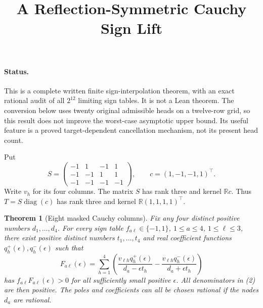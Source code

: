 \documentclass[11pt]{article}
\title{A Reflection-Symmetric Cauchy Sign Lift}
\author{}
\date{}
\newtheorem{theorem}{Theorem}
\begin{document}
\maketitle

\paragraph{Status.}
This is a complete written finite sign-interpolation theorem, with an
exact rational audit of all $2^{12}$ limiting sign tables. It is not a
Lean theorem. The conversion below uses twenty original admissible
heads on a twelve-row grid, so this result does not improve the
worst-case asymptotic upper bound. Its useful feature is a proved
target-dependent cancellation mechanism, not its present head count.

Put
\[
 S=\begin{pmatrix}-1&1&-1&1\\-1&-1&1&1\\-1&-1&-1&-1\end{pmatrix},
 \qquad c=(1,-1,-1,1)^\top.
 \tag{1}
\]
Write $v_h$ for its four columns. The matrix $S$ has rank three and
kernel $\mathbb Rc$. Thus $T=S\operatorname{diag}(c)$ has rank three
and kernel $\mathbb R(1,1,1,1)^\top$.

\begin{theorem}[Eight masked Cauchy columns]
Fix any four distinct positive numbers $d_1,\ldots,d_4$. For every
sign table $f_{a\ell}\in\{-1,1\}$, $1\le a\le4$, $1\le\ell\le3$,
there exist positive distinct numbers $t_1,\ldots,t_4$ and real
coefficient functions $q_h^+(\epsilon),q_h^-(\epsilon)$ such that
\[
 F_{a\ell}(\epsilon)=\sum_{h=1}^4
 \left(\frac{v_{\ell h}q_h^+(\epsilon)}{d_a-\epsilon t_h}
       -\frac{v_{\ell h}q_h^-(\epsilon)}{d_a+\epsilon t_h}\right)
 \tag{2}
\]
has $f_{a\ell}F_{a\ell}(\epsilon)>0$ for all sufficiently small
positive $\epsilon$. All denominators in (2) are then positive.
The poles and coefficients can all be chosen rational if the nodes
$d_a$ are rational.
\end{theorem}
\end{document}
